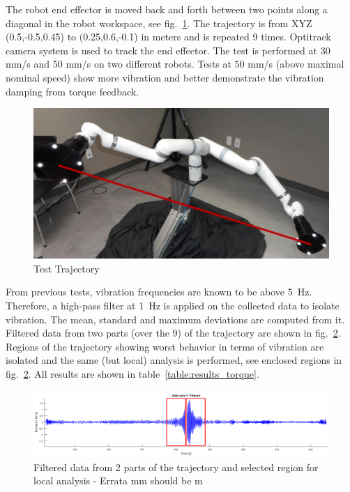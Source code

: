 The robot end effector is moved back and forth between two points along a diagonal in the robot workspace, see fig.~\ref{fig:path}. The trajectory is from XYZ (0.5,-0.5,0.45) to (0.25,0.6,-0.1) in meters and is repeated 9 times. Optitrack camera system is used to track the end effector. The test is performed at 30 mm/s and 50 mm/s on two different robots. Tests at 50 mm/s (above maximal nominal speed) show more vibration and better demonstrate the vibration damping from torque feedback.

\begin{figure}
	\begin{center}
	\includegraphics[width=.8\textwidth]{./images/testPath.jpg}%
		\caption{Test Trajectory}
	\label{fig:path}
	\end{center}
\end{figure}

From previous tests, vibration frequencies are known to be above 5~Hz. Therefore, a high-pass filter at 1~Hz is applied on the collected data to isolate vibration.  The mean, standard and maximum deviations are computed from it. Filtered data from two parts (over the 9) of the trajectory are shown in fig.~\ref{fig:data}. Regions of the trajectory showing worst behavior in terms of vibration are isolated and the same (but local) analysis is performed, see enclosed regions in fig.~\ref{fig:data}. All results are shown in table~\ref{table:results_torque}.

\begin{figure}
	\begin{center}
			\includegraphics[width=1\textwidth]{./images/data2.pdf}%
			\caption{Filtered data from 2 parts of the trajectory and selected region for local analysis - Errata mm should be m}
			\label{fig:data}
	\end{center}
\end{figure}